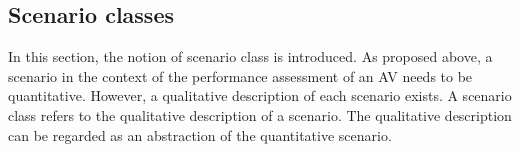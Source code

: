 \subsection{Scenario classes}
\label{sec:scenario classes}
In this section, the notion of scenario class is introduced. As proposed above, a scenario in the context of the performance assessment of an AV needs to be quantitative. However, a qualitative description of each scenario exists. 
\cbstart
A scenario class refers to the qualitative description of a scenario.
The qualitative description can be regarded as an abstraction of the quantitative scenario. 




\cbend

